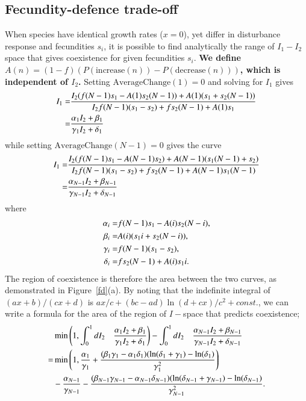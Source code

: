 \subsection{Fecundity-defence trade-off}
When species have identical growth rates ($x=0$), yet differ in disturbance response and fecundities $s_i$, it is possible to find analytically the range of $I_1 - I_2$ space that gives coexistence for given fecundities $s_i$.\textbf{ We define $A(n)=(1-f)(P(\text{increase}(n))-P(\text{decrease}(n)))$, which is independent of $I_2$.} Setting $\text{AverageChange}(1)=0$ and solving for $I_1$ gives
\begin{align}
\label{fdac1sol}
I_1=&\frac{I_2(f(N-1)s_1-A(1)s_2(N-1)) +A(1)(s_1+s_2(N-1))}{I_2f(N-1)(s_1-s_2) +fs_2(N-1) +A(1)s_1}\notag \\
=&\frac{\alpha_1 I_2 +\beta_1}{\gamma_1 I_2+\delta_1}
\end{align}
while setting $\text{AverageChange}(N-1)=0$ gives the curve
\begin{align}
\label{fdacnsol}
I_1=&\frac{I_2(f(N-1)s_1-A(N-1)s_2) +A(N-1)(s_1(N-1)+s_2)}{I_2f(N-1)(s_1-s_2) +fs_2(N-1) +A(N-1)s_1(N-1)}\notag \\
=&\frac{\alpha_{N-1} I_2 +\beta_{N-1}}{\gamma_{N-1} I_2+\delta_{N-1}}
\end{align}
where
\begin{align}
\alpha_i =& f(N-1)s_1 - A(i) s_2 (N-i), \notag \\
\beta_i =& A(i) (s_1 i + s_2(N-i)), \notag \\
\gamma_i =& f(N-1)(s_1-s_2), \notag \\
\delta_i =& fs_2(N-1) + A(i)s_1 i. \notag
\end{align}
The region of coexistence is therefore the area between the two curves, as demonstrated in Figure~\ref{fd}(a). By noting that the indefinite integral of $(a x +b)/(c x +d)$ is $ax/c+(bc-ad)\ln(d+cx)/c^2 +const.$, we can write a formula for the area of the region of $I-$space that predicts coexistence;
\begin{align}
&\min \left(1, \int_0^1 dI_2 \quad \frac{\alpha_1 I_2 +\beta_1}{\gamma_1 I_2+\delta_1} \right) -  \int_0^1 dI_2\quad \frac{\alpha_{N-1} I_2 +\beta_{N-1}}{\gamma_{N-1} I_2+\delta_{N-1}}  \notag \\
=&\min\left(1,\frac{\alpha_1}{\gamma_1}+\frac{(\beta_1 \gamma_1 - \alpha_1 \delta_1)(\ln(\delta_1 +\gamma_1)-\ln(\delta_1)}{\gamma_1^2}\right) \\
&-\frac{\alpha_{N-1}}{\gamma_{N-1}}-\frac{(\beta_{N-1} \gamma_{N-1} - \alpha_{N-1} \delta_{N-1})(\ln(\delta_{N-1} +\gamma_{N-1})-\ln(\delta_{N-1})}{\gamma_{N-1}^2}. \notag
\end{align}
